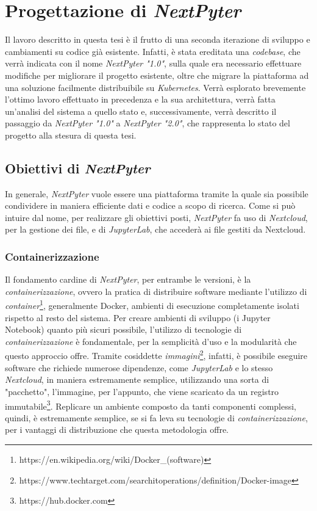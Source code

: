 \chapter{Progettazione di \textit{NextPyter}}
Il lavoro descritto in questa tesi è il frutto di una seconda iterazione di sviluppo e cambiamenti su codice già esistente. Infatti, è stata ereditata una \textit{codebase}, che verrà indicata con il nome \textit{NextPyter "1.0"}, sulla quale era necessario effettuare modifiche per migliorare il progetto esistente, oltre che migrare la piattaforma ad una soluzione facilmente distribuibile su \textit{Kubernetes}. \newline
Verrà esplorato brevemente l'ottimo lavoro effettuato in precedenza e la sua architettura, verrà fatta un'analisi del sistema a quello stato e, successivamente, verrà descritto il passaggio da \textit{NextPyter "1.0"} a \textit{NextPyter "2.0"}, che rappresenta lo stato del progetto alla stesura di questa tesi. 
\section{Obiettivi di \textit{NextPyter}}
In generale, \textit{NextPyter} vuole essere una piattaforma tramite la quale sia possibile condividere in maniera efficiente dati e codice a scopo di ricerca. Come si può intuire dal nome, per realizzare gli obiettivi posti, \textit{NextPyter} fa uso di \textit{Nextcloud}, per la gestione dei file, e di \textit{JupyterLab}, che accederà ai file gestiti da Nextcloud.

\subsection{Containerizzazione}
Il fondamento cardine di \textit{NextPyter}, per entrambe le versioni, è la \textit{containerizzazione}, ovvero la pratica di distribuire software mediante l'utilizzo di \textit{container}\footnote{https://en.wikipedia.org/wiki/Docker\_(software)}, generalmente Docker, ambienti di esecuzione completamente isolati rispetto al resto del sistema. 
\newline
Per creare ambienti di sviluppo (i Jupyter Notebook) quanto più sicuri possibile, l'utilizzo di tecnologie di \textit{containerizzazione} è fondamentale, per la semplicità d'uso e la modularità che questo approccio offre.\newline
Tramite cosiddette \textit{immagini}\footnote{https://www.techtarget.com/searchitoperations/definition/Docker-image}, infatti, è possibile eseguire software che richiede numerose dipendenze, come \textit{JupyterLab} e lo stesso \textit{Nextcloud}, in maniera estremamente semplice, utilizzando una sorta di "pacchetto", l'immagine, per l'appunto, che viene scaricato da un registro immutabile\footnote{https://hub.docker.com}. Replicare un ambiente composto da tanti componenti complessi, quindi, è estremamente semplice, se si fa leva su tecnologie di \textit{containerizzazione}, per i vantaggi di distribuzione che questa metodologia offre.

